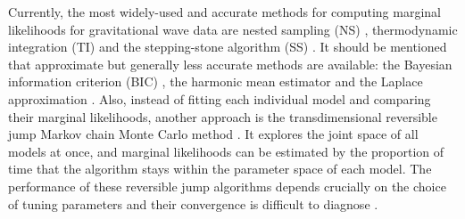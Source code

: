 \documentclass[%
 reprint,
 amsmath,amssymb,
 aps,
]{revtex4-2}
\begin{document}





Currently, the most widely-used and accurate methods for computing marginal likelihoods for gravitational wave data are nested sampling (NS) \cite{skilling2006nested, veitch2010bayesian}, thermodynamic integration (TI) \cite{gelman1998simulating, lartillot2006computing} and the stepping-stone algorithm (SS) \cite{xie2011improving, maturana2019stepping}. It should be mentioned that approximate but generally less accurate methods are available: the Bayesian information criterion (BIC) \cite{StoicaP.2004Msar}, the harmonic mean estimator \cite{NewtonRaftery} and the Laplace approximation \cite{TierneyLuke1989FELA}. Also, instead of fitting each individual model and comparing their marginal likelihoods,
another approach is the transdimensional reversible jump Markov chain Monte Carlo method \cite{green1995reversible, umstatter2005bayesian}. It explores the joint space of all models at once, and marginal likelihoods can be estimated by the proportion of time  that the algorithm stays within the parameter space of each model. The performance of these reversible jump algorithms depends crucially on the choice of tuning parameters and their convergence is difficult to diagnose \cite{Somo2020CTfT}.
\end{document}
